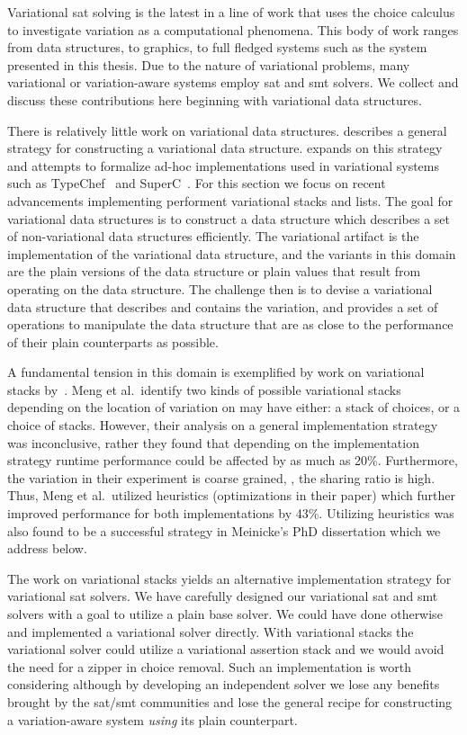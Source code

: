 \label{section:related-work:variational-systems}
%
Variational \ac{sat} solving is the latest in a line of work that uses the
choice calculus to investigate variation as a computational phenomena. This body
of work ranges from data structures, to graphics, to full fledged systems such
as the system presented in this thesis. Due to the nature of variational
problems, many variational or variation-aware systems employ \ac{sat} and
\ac{smt} solvers. We collect and discuss these contributions here beginning with
variational data structures.

There is relatively little work on variational data structures.
\citet{EWC13fosd} describes a general strategy for constructing a variational
data structure. \citet{Walk14onward} expands on this strategy and attempts to
formalize ad-hoc implementations used in variational systems such as
TypeChef~\cite{KKHL:FOSD10} and SuperC~\cite{GG:PLDI12}. For this section we
focus on recent advancements implementing performent variational stacks and
lists. The goal for variational data structures is to construct a data structure
which describes a set of non-variational data structures efficiently. The
variational artifact is the implementation of the variational data structure,
and the variants in this domain are the plain versions of the data structure or
plain values that result from operating on the data structure. The challenge
then is to devise a variational data structure that describes and contains the
variation, and provides a set of operations to manipulate the data structure
that are as close to the performance of their plain counterparts as possible.

A fundamental tension in this domain is exemplified by work on variational
stacks by~\citet{MMWWK17vamos}. Meng et al.\ identify two kinds of possible
variational stacks depending on the location of variation on may have either: a
stack of choices, or a choice of stacks. However, their analysis on a general
implementation strategy was inconclusive, rather they found that depending on
the implementation strategy runtime performance could be affected by as much as
20\%. Furthermore, the variation in their experiment is coarse grained, \ie{},
the sharing ratio is high. Thus, Meng et al.\ utilized heuristics (optimizations
in their paper) which further improved performance for both implementations by
43\%. Utilizing heuristics was also found to be a successful strategy in
Meinicke's PhD dissertation which we address below.

The work on variational stacks yields an alternative implementation strategy for
variational \ac{sat} solvers. We have carefully designed our variational
\ac{sat} and \ac{smt} solvers with a goal to utilize a plain base solver. We
could have done otherwise and implemented a variational solver directly. With
variational stacks the variational solver could utilize a variational assertion
stack and we would avoid the need for a zipper in choice removal. Such an
implementation is worth considering although by developing an independent solver
we lose any benefits brought by the \ac{sat}/\ac{smt} communities and lose the
general recipe for constructing a variation-aware system \emph{using} its plain
counterpart.

